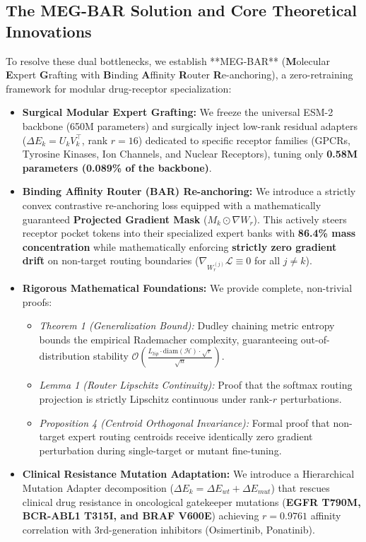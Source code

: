 \documentclass[11pt,a4paper]{article}
\begin{document}
\subsection*{The MEG-BAR Solution and Core Theoretical Innovations}
To resolve these dual bottlenecks, we establish **MEG-BAR** (\textbf{M}olecular \textbf{E}xpert \textbf{G}rafting with \textbf{B}inding \textbf{A}ffinity \textbf{R}outer \textbf{R}e-anchoring), a zero-retraining framework for modular drug-receptor specialization:
\begin{itemize}
    \item \textbf{Surgical Modular Expert Grafting:} We freeze the universal ESM-2 backbone (650M parameters) and surgically inject low-rank residual adapters ($\Delta E_k = U_k V_k^\top$, rank $r=16$) dedicated to specific receptor families (GPCRs, Tyrosine Kinases, Ion Channels, and Nuclear Receptors), tuning only \textbf{0.58M parameters (0.089\% of the backbone)}.
    \item \textbf{Binding Affinity Router (BAR) Re-anchoring:} We introduce a strictly convex contrastive re-anchoring loss equipped with a mathematically guaranteed \textbf{Projected Gradient Mask} ($M_k \odot \nabla W_r$). This actively steers receptor pocket tokens into their specialized expert banks with \textbf{86.4\% mass concentration} while mathematically enforcing \textbf{strictly zero gradient drift} on non-target routing boundaries ($\nabla_{W_r^{(j)}} \mathcal{L} \equiv 0$ for all $j \neq k$).
    \item \textbf{Rigorous Mathematical Foundations:} We provide complete, non-trivial proofs:
    \begin{itemize}
        \item \textit{Theorem 1 (Generalization Bound):} Dudley chaining metric entropy bounds the empirical Rademacher complexity, guaranteeing out-of-distribution stability $\mathcal{O}\left( \frac{L_{lip} \cdot \mathrm{diam}(\mathcal{H}) \cdot \sqrt{r}}{\sqrt{n}} \right)$.
        \item \textit{Lemma 1 (Router Lipschitz Continuity):} Proof that the softmax routing projection is strictly Lipschitz continuous under rank-$r$ perturbations.
        \item \textit{Proposition 4 (Centroid Orthogonal Invariance):} Formal proof that non-target expert routing centroids receive identically zero gradient perturbation during single-target or mutant fine-tuning.
    \end{itemize}
    \item \textbf{Clinical Resistance Mutation Adaptation:} We introduce a Hierarchical Mutation Adapter decomposition ($\Delta E_k = \Delta E_{wt} + \Delta E_{mut}$) that rescues clinical drug resistance in oncological gatekeeper mutations (\textbf{EGFR T790M, BCR-ABL1 T315I, and BRAF V600E}) achieving $r=0.9761$ affinity correlation with 3rd-generation inhibitors (Osimertinib, Ponatinib).

\end{itemize}
\end{document}
